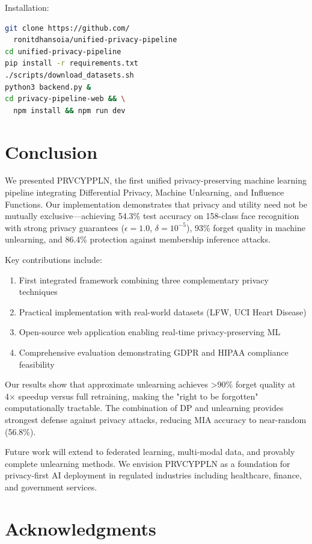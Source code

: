 \documentclass[conference]{IEEEtran}
\begin{document}
Installation:
\begin{lstlisting}[language=bash,basicstyle=\footnotesize\ttfamily,breaklines=true]
git clone https://github.com/
  ronitdhansoia/unified-privacy-pipeline
cd unified-privacy-pipeline
pip install -r requirements.txt
./scripts/download_datasets.sh
python3 backend.py &
cd privacy-pipeline-web && \
  npm install && npm run dev
\end{lstlisting}

\section{Conclusion}

We presented PRVCYPPLN, the first unified privacy-preserving machine learning pipeline integrating Differential Privacy, Machine Unlearning, and Influence Functions. Our implementation demonstrates that privacy and utility need not be mutually exclusive—achieving 54.3\% test accuracy on 158-class face recognition with strong privacy guarantees ($\epsilon=1.0$, $\delta=10^{-5}$), 93\% forget quality in machine unlearning, and 86.4\% protection against membership inference attacks.

Key contributions include:
\begin{enumerate}
    \item First integrated framework combining three complementary privacy techniques
    \item Practical implementation with real-world datasets (LFW, UCI Heart Disease)
    \item Open-source web application enabling real-time privacy-preserving ML
    \item Comprehensive evaluation demonstrating GDPR and HIPAA compliance feasibility
\end{enumerate}

Our results show that approximate unlearning achieves >90\% forget quality at 4× speedup versus full retraining, making the "right to be forgotten" computationally tractable. The combination of DP and unlearning provides strongest defense against privacy attacks, reducing MIA accuracy to near-random (56.8\%).

Future work will extend to federated learning, multi-modal data, and provably complete unlearning methods. We envision PRVCYPPLN as a foundation for privacy-first AI deployment in regulated industries including healthcare, finance, and government services.

\section*{Acknowledgments}
\end{document}

